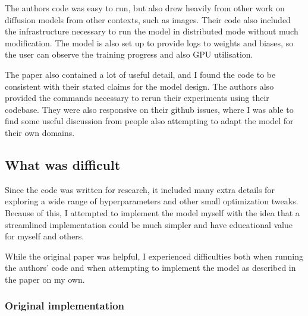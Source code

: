 
The authors code was easy to run, but also drew heavily from other work on diffusion models from other contexts, such as images. Their code also included the infrastructure necessary to run the model in distributed mode without much modification. The model is also set up to provide logs to weights and biases, so the user can observe the training progress and also GPU utilisation.

The paper also contained a lot of useful detail, and I found the code to be consistent with their stated claims for the model design. The authors also provided the commands necessary to rerun their experiments using their codebase. They were also responsive on their github issues, where I was able to find some useful discussion from people also attempting to adapt the model for their own domains.

\subsection{What was difficult}



Since the code was written for research, it included many extra details for exploring a wide range of hyperparameters and other small optimization tweaks. Because of this, I attempted to implement the model myself with the idea that a streamlined implementation could be much simpler and have educational value for myself and others.

While the original paper was helpful, I experienced difficulties both when running the authors' code and when attempting to implement the model as described in the paper on my own.

\subsubsection{Original implementation}

